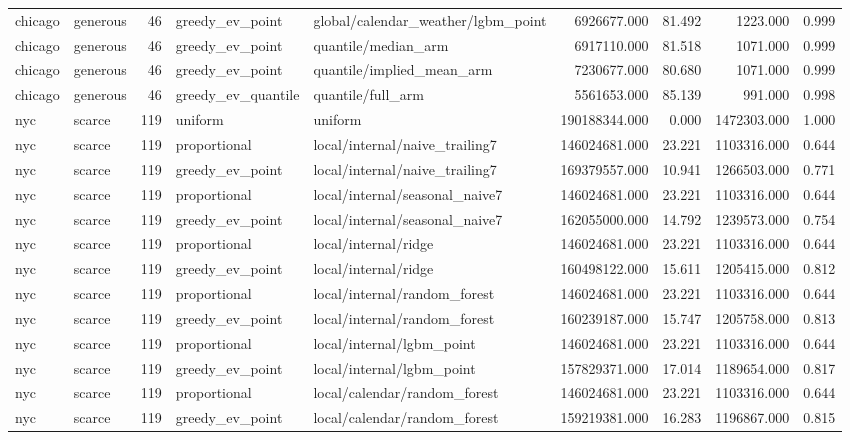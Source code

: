 \begin{tabular}{llrllrrrr}
chicago & generous & 46 & greedy\_ev\_point & global/calendar\_weather/lgbm\_point & 6926677.000 & 81.492 & 1223.000 & 0.999 \\
chicago & generous & 46 & greedy\_ev\_point & quantile/median\_arm & 6917110.000 & 81.518 & 1071.000 & 0.999 \\
chicago & generous & 46 & greedy\_ev\_point & quantile/implied\_mean\_arm & 7230677.000 & 80.680 & 1071.000 & 0.999 \\
chicago & generous & 46 & greedy\_ev\_quantile & quantile/full\_arm & 5561653.000 & 85.139 & 991.000 & 0.998 \\
nyc & scarce & 119 & uniform & uniform & 190188344.000 & 0.000 & 1472303.000 & 1.000 \\
nyc & scarce & 119 & proportional & local/internal/naive\_trailing7 & 146024681.000 & 23.221 & 1103316.000 & 0.644 \\
nyc & scarce & 119 & greedy\_ev\_point & local/internal/naive\_trailing7 & 169379557.000 & 10.941 & 1266503.000 & 0.771 \\
nyc & scarce & 119 & proportional & local/internal/seasonal\_naive7 & 146024681.000 & 23.221 & 1103316.000 & 0.644 \\
nyc & scarce & 119 & greedy\_ev\_point & local/internal/seasonal\_naive7 & 162055000.000 & 14.792 & 1239573.000 & 0.754 \\
nyc & scarce & 119 & proportional & local/internal/ridge & 146024681.000 & 23.221 & 1103316.000 & 0.644 \\
nyc & scarce & 119 & greedy\_ev\_point & local/internal/ridge & 160498122.000 & 15.611 & 1205415.000 & 0.812 \\
nyc & scarce & 119 & proportional & local/internal/random\_forest & 146024681.000 & 23.221 & 1103316.000 & 0.644 \\
nyc & scarce & 119 & greedy\_ev\_point & local/internal/random\_forest & 160239187.000 & 15.747 & 1205758.000 & 0.813 \\
nyc & scarce & 119 & proportional & local/internal/lgbm\_point & 146024681.000 & 23.221 & 1103316.000 & 0.644 \\
nyc & scarce & 119 & greedy\_ev\_point & local/internal/lgbm\_point & 157829371.000 & 17.014 & 1189654.000 & 0.817 \\
nyc & scarce & 119 & proportional & local/calendar/random\_forest & 146024681.000 & 23.221 & 1103316.000 & 0.644 \\
nyc & scarce & 119 & greedy\_ev\_point & local/calendar/random\_forest & 159219381.000 & 16.283 & 1196867.000 & 0.815 \\

\end{tabular}

